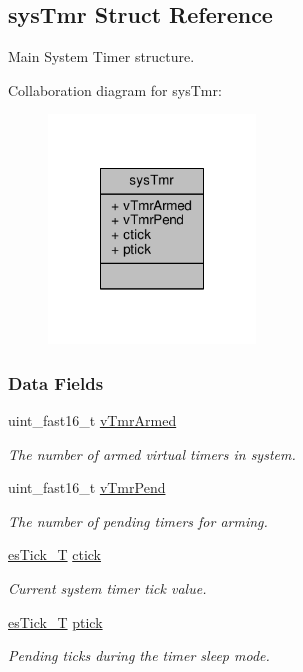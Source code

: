 \hypertarget{structsysTmr}{\subsection{sys\-Tmr Struct Reference}
\label{structsysTmr}
}


Main System Timer structure.  




Collaboration diagram for sys\-Tmr\-:\nopagebreak
\begin{figure}[H]
\begin{center}
\leavevmode
\includegraphics[width=156pt]{structsysTmr__coll__graph}
\end{center}
\end{figure}
\subsubsection*{Data Fields}
\begin{DoxyCompactItemize}
\item 
uint\-\_\-fast16\-\_\-t \hyperlink{structsysTmr_a3fb347fcb0b2bda6795f5dd8c4413873}{v\-Tmr\-Armed}
\begin{DoxyCompactList}\small\item\em The number of armed virtual timers in system. \end{DoxyCompactList}\item 
uint\-\_\-fast16\-\_\-t \hyperlink{structsysTmr_a63badc568f8fde1dd566e1f456aab008}{v\-Tmr\-Pend}
\begin{DoxyCompactList}\small\item\em The number of pending timers for arming. \end{DoxyCompactList}\item 
\hyperlink{group__kern__vtmr_ga844873888c186ee81eb66620dadb0451}{es\-Tick\-\_\-\-T} \hyperlink{structsysTmr_a1f1fac425438fad41278db9f2865d0a3}{ctick}
\begin{DoxyCompactList}\small\item\em Current system timer tick value. \end{DoxyCompactList}\item 
\hyperlink{group__kern__vtmr_ga844873888c186ee81eb66620dadb0451}{es\-Tick\-\_\-\-T} \hyperlink{structsysTmr_a338f10146bdac2bdd69447fca0fe75f8}{ptick}
\begin{DoxyCompactList}\small\item\em Pending ticks during the timer sleep mode. \end{DoxyCompactList}\end{DoxyCompactItemize}


